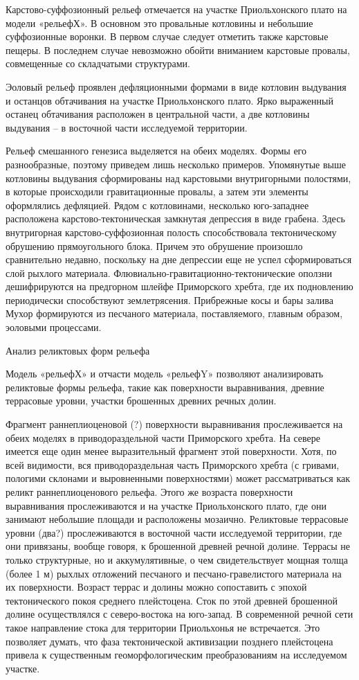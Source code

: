 \documentclass[runningheads]{AIIT}
\begin{document}
Карстово-суффозионный рельеф отмечается на участке Приольхонского плато на модели «рельефХ». В основном это провальные котловины и небольшие суффозионные воронки. В первом случае следует отметить также карстовые пещеры. В последнем случае невозможно обойти вниманием карстовые провалы, совмещенные со складчатыми структурами.

Эоловый рельеф проявлен дефляционными формами в виде котловин выдувания и останцов обтачивания на участке Приольхонского плато. Ярко выраженный останец обтачивания расположен в центральной части, а две котловины выдувания – в восточной части исследуемой территории.

Рельеф смешанного генезиса выделяется на обеих моделях. Формы его разнообразные, поэтому приведем лишь несколько примеров. Упомянутые выше котловины выдувания сформированы над карстовыми внутригорными полостями, в которые происходили гравитационные провалы, а затем эти элементы оформлялись дефляцией. Рядом с котловинами, несколько юго-западнее расположена карстово-тектоническая замкнутая депрессия в виде грабена. Здесь внутригорная карстово-суффозионная полость способствовала тектоническому обрушению прямоугольного блока. Причем это обрушение произошло сравнительно недавно, поскольку на дне депрессии еще не успел сформироваться слой рыхлого материала. Флювиально-гравитационно-тектонические оползни дешифрируются на предгорном шлейфе Приморского хребта, где их подновлению периодически способствуют землетрясения. Прибрежные косы и бары залива Мухор формируются из песчаного материала, поставляемого, главным образом, эоловыми процессами.

Анализ реликтовых форм рельефа

Модель «рельефХ» и отчасти модель «рельефY» позволяют анализировать реликтовые формы рельефа, такие как поверхности выравнивания, древние террасовые уровни, участки брошенных древних речных долин.

Фрагмент раннеплиоценовой (?) поверхности выравнивания прослеживается на обеих моделях в приводораздельной части Приморского хребта. На севере имеется еще один менее выразительный фрагмент этой поверхности. Хотя, по всей видимости, вся приводораздельная часть Приморского хребта (с гривами, пологими склонами и выровненными поверхностями) может рассматриваться как реликт раннеплиоценового рельефа. Этого же возраста поверхности выравнивания прослеживаются и на участке Приольхонского плато, где они занимают небольшие площади и расположены мозаично.
Реликтовые террасовые уровни (два?) прослеживаются в восточной части исследуемой территории, где они привязаны, вообще говоря, к брошенной древней речной долине. Террасы не только структурные, но и аккумулятивные, о чем свидетельствует мощная толща (более 1 м) рыхлых отложений песчаного и песчано-гравелистого материала на их поверхности. Возраст террас и долины можно сопоставить с эпохой тектонического покоя среднего плейстоцена. Сток по этой древней брошенной долине осуществлялся с северо-востока на юго-запад. В современной речной сети такое направление стока для территории Приольхонья не встречается. Это позволяет думать, что фаза тектонической активизации позднего плейстоцена привела к существенным геоморфологическим преобразованиям на исследуемом участке.
\end{document}
